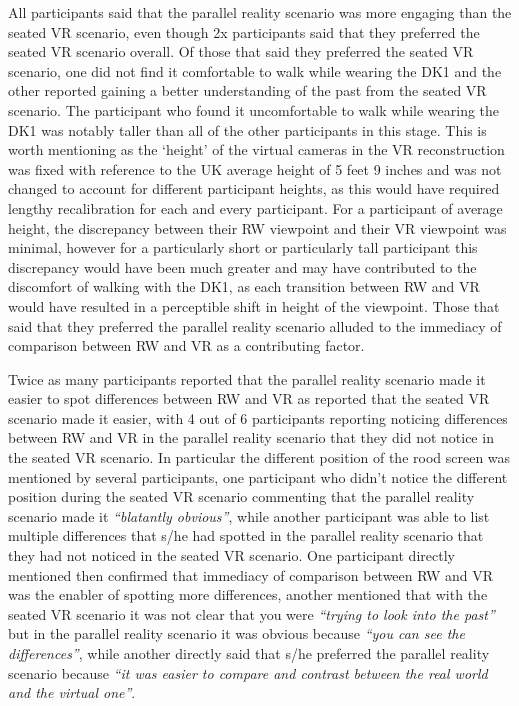 All participants said that the parallel reality scenario was more engaging than the seated VR scenario, even though 2x participants said that they preferred the seated VR scenario overall. Of those that said they preferred the seated VR scenario, one did not find it comfortable to walk while wearing the DK1 and the other reported gaining a better understanding of the past from the seated VR scenario. The participant who found it uncomfortable to walk while wearing the DK1 was notably taller than all of the other participants in this stage. This is worth mentioning as the `height' of the virtual cameras in the VR reconstruction was fixed with reference to the UK average height of 5 feet 9 inches and was not changed to account for different participant heights, as this would have required lengthy recalibration for each and every participant. For a participant of average height, the discrepancy between their RW viewpoint and their VR viewpoint was minimal, however for a particularly short or particularly tall participant this discrepancy would have been much greater and may have contributed to the discomfort of walking with the DK1, as each transition between RW and VR would have resulted in a perceptible shift in height of the viewpoint. Those that said that they preferred the parallel reality scenario alluded to the immediacy of comparison between RW and VR as a contributing factor.

Twice as many participants reported that the parallel reality scenario made it easier to spot differences between RW and VR as reported that the seated VR scenario made it easier, with 4 out of 6 participants reporting noticing differences between RW and VR in the parallel reality scenario that they did not notice in the seated VR scenario. In particular the different position of the rood screen was mentioned by several participants, one participant who didn't notice the different position during the seated VR scenario commenting that the parallel reality scenario made it \textit{``blatantly obvious''}, while another participant was able to list multiple differences that s/he had spotted in the parallel reality scenario that they had not noticed in the seated VR scenario. One participant directly mentioned then confirmed that immediacy of comparison between RW and VR was the enabler of spotting more differences, another mentioned that with the seated VR scenario it was not clear that you were \textit{``trying to look into the past''} but in the parallel reality scenario it was obvious because \textit{``you can see the differences''}, while another directly said that s/he preferred the parallel reality scenario because \textit{``it was easier to compare and contrast between the real world and the virtual one''}.

